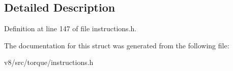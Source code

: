 \subsection{Detailed Description}


Definition at line 147 of file instructions.\+h.



The documentation for this struct was generated from the following file\+:\begin{DoxyCompactItemize}
\item 
v8/src/torque/instructions.\+h\end{DoxyCompactItemize}
